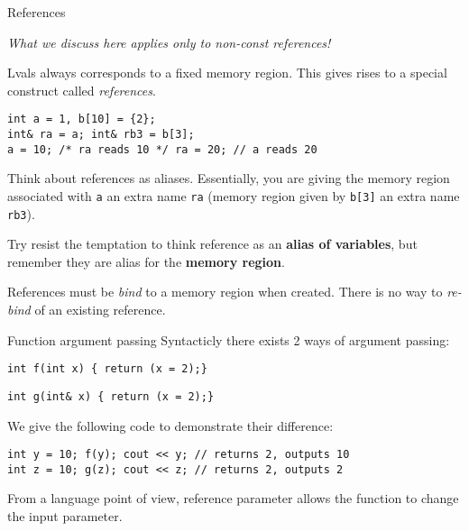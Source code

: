 \begin{frame}[fragile]{References}

\textit{What we discuss here applies only to non-const references!}

Lvals always corresponds to a fixed memory region. This gives rises to a special construct called \textit{references}. 

\begin{verbatim}
int a = 1, b[10] = {2};
int& ra = a; int& rb3 = b[3];
a = 10; /* ra reads 10 */ ra = 20; // a reads 20
\end{verbatim}

Think about references as aliases. Essentially, you are giving the memory region associated with \texttt{a} an extra name \texttt{ra} (memory region given by \texttt{b[3]} an extra name \texttt{rb3}). 

Try resist the temptation to think reference as an \textbf{alias of variables}, but remember they are alias for the \textbf{memory region}.

References must be \textit{bind} to a memory region when created. There is no way to \textit{re-bind} of an existing reference. 
\end{frame}

\begin{frame}[fragile]{Function argument passing}
Syntacticly there exists 2 ways of argument passing:

\begin{verbatim}
int f(int x) { return (x = 2);}
\end{verbatim} 

\begin{verbatim}
int g(int& x) { return (x = 2);}
\end{verbatim} 

We give the following code to demonstrate their difference:
\begin{verbatim}
int y = 10; f(y); cout << y; // returns 2, outputs 10
int z = 10; g(z); cout << z; // returns 2, outputs 2
\end{verbatim}
From a language point of view, reference parameter allows the function to change the input parameter. 


\end{frame}


